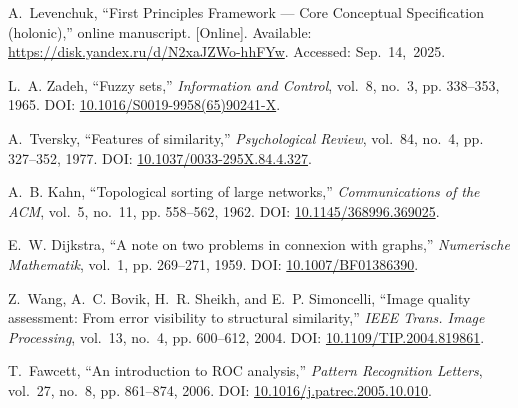 \documentclass[conference]{IEEEtran}
\begin{document}
\begin{thebibliography}{99}

A.~Levenchuk, ``First Principles Framework --- Core Conceptual Specification (holonic),'' online manuscript. [Online]. Available: \url{https://disk.yandex.ru/d/N2xaJZWo-hhFYw}. Accessed: Sep.~14,~2025.

L.~A. Zadeh, ``Fuzzy sets,'' \emph{Information and Control}, vol.~8, no.~3, pp. 338--353, 1965. DOI: \url{10.1016/S0019-9958(65)90241-X}.

A.~Tversky, ``Features of similarity,'' \emph{Psychological Review}, vol.~84, no.~4, pp. 327--352, 1977. DOI: \url{10.1037/0033-295X.84.4.327}.

A.~B. Kahn, ``Topological sorting of large networks,'' \emph{Communications of the ACM}, vol.~5, no.~11, pp. 558--562, 1962. DOI: \url{10.1145/368996.369025}.

E.~W. Dijkstra, ``A note on two problems in connexion with graphs,'' \emph{Numerische Mathematik}, vol.~1, pp. 269--271, 1959. DOI: \url{10.1007/BF01386390}.

Z.~Wang, A.~C. Bovik, H.~R. Sheikh, and E.~P. Simoncelli, ``Image quality assessment: From error visibility to structural similarity,'' \emph{IEEE Trans. Image Processing}, vol.~13, no.~4, pp. 600--612, 2004. DOI: \url{10.1109/TIP.2004.819861}.

T.~Fawcett, ``An introduction to ROC analysis,'' \emph{Pattern Recognition Letters}, vol.~27, no.~8, pp. 861--874, 2006. DOI: \url{10.1016/j.patrec.2005.10.010}.
\end{thebibliography}
\end{document}

